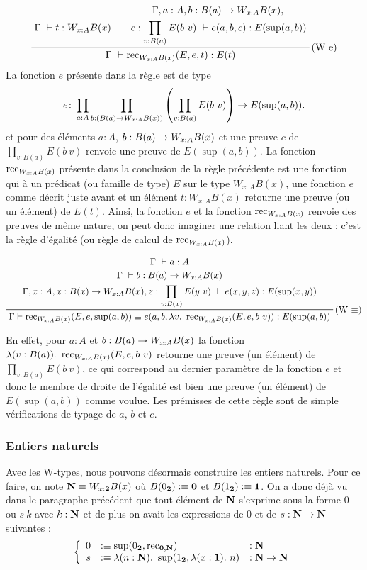 \documentclass[../../rapport.tex]{subfiles}
\begin{document}
  $$
  \prfinterspace=2em
  \prftree[r]{(W e)}
  {\Gamma\ \vdash t : W_{x:A}B(x)}
  {
    \prfStackPremises
    {\Gamma, a : A, b : B(a) \fun W_{x:A}B(x),}
    {c : \prod_{v:B(a)}{E(b\ v)}\ \vdash e(a, b, c) : E(\sup(a, b))}
  }
  {\Gamma\ \vdash \rec_{W_{x:A}B(x)}(E, e, t) : E(t)}
  $$
  La fonction $e$ présente dans la règle est de type
  $$e \colon \prod_{a:A}\prod_{b:(B(a) \rightarrow W_{x:A}B(x))}\left(\prod_{v:B(a)}E(b\ v)\right) \rightarrow E(\sup(a, b)).$$
  et pour des éléments $a : A$, $b : B(a) \rightarrow W_{x:A}B(x)$ et une preuve $c$ de $\prod_{v:B(a)}{E(b\ v)}$
  renvoie une preuve de $E(\sup(a, b))$.
  La fonction $\operatorname{rec}_{W_{x:A}B(x)}$ présente dans la conclusion de la règle précédente est une fonction qui à un prédicat
  (ou famille de type) $E$ sur le type $W_{x:A}B(x)$, une fonction $e$ comme décrit juste avant et un élément $t : W_{x:A}B(x)$
  retourne une preuve (ou un élément) de $E(t)$. Ainsi, la fonction $e$ et la fonction $\operatorname{rec}_{W_{x:A}B(x)}$ renvoie des preuves de même nature,
  on peut donc imaginer une relation liant les deux : c'est la règle d'égalité (ou règle de calcul de $\operatorname{rec}_{W_{x:A}B(x)}$).

  $$
  \prfinterspace=2em
  \prftree[r]{(W $\equiv$)}
    {\prfStackPremises
      {\Gamma\ \vdash a : A}
      {\Gamma\ \vdash b : B(a) \fun W_{x:A}B(x)}
      {\Gamma, x : A, x : B(x) \fun W_{x:A}B(x), z : \prod_{v:B(x)}{E(y\ v)}\ \vdash e(x, y, z) : E(\sup(x, y))}
    }
      {\Gamma \vdash \rec_{W_{x:A}B(x)}(E, e, \sup(a, b)) \equiv e(a, b, \lambda v.\ \rec_{W_{x:A}B(x)}(E, e, b\ v)) : E(\sup(a, b))}
  $$

  En effet, pour $a : A$ et $b : B(a) \rightarrow W_{x:A}B(x)$ la fonction $\lambda(v : B(a)).\ \operatorname{rec}_{W_{x:A}B(x)}(E, e, b\ v)$
  retourne une preuve (un élément) de $\prod_{v : B(a)}{E(b \ v)}$, ce qui correspond au
  dernier paramètre de la fonction $e$ et donc le membre de droite de l'égalité est bien une preuve (un élément)
  de $E(\sup(a, b))$ comme voulue.
  Les prémisses de cette règle sont de simple vérifications de typage de $a$, $b$ et $e$.

  \subsubsection{Entiers naturels}

  Avec les W-types, nous pouvons désormais construire les entiers naturels.
  Pour ce faire, on note $\mathbf N \equiv W_{x : \operatorname{\textbf{2}}}B(x)$ où $B(0_{\operatorname{\textbf{2}}}) :\equiv \operatorname{\textbf{0}}$ et $B(1_{\operatorname{\textbf{2}}}) :\equiv \operatorname{\textbf{1}}$.
  On a donc déjà vu dans le paragraphe précédent que tout élément de $\mathbf N$ s'exprime sous la forme $0$ ou $s\ k$
  avec $k : \mathbf N$ et de plus on avait les expressions de $0$ et de $s : \mathbf N \rightarrow \mathbf N$ suivantes :
  $$\left\{ \begin{array}{rll}
      0 &:\equiv \sup(0_{\operatorname{\textbf{2}}}, \operatorname{rec}_{\operatorname{\textbf{0}}, \mathbf N}) 				&: \mathbf N \\
      s &:\equiv \lambda(n : \mathbf N).\ \sup(1_{\operatorname{\textbf{2}}}, \lambda(x : \operatorname{\textbf{1}}).\ n)	&: \mathbf N \rightarrow \mathbf N
  \end{array}\right.$$
\end{document}

